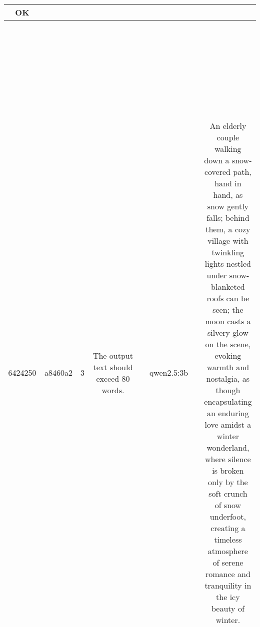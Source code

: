 \begin{table}[h!]
\begin{tabular}{|c|c|c|c|c|c|c|c|c|c|c|}
OK\\
\hline
6424250 & a8460a2 & 3 & The output text should exceed 80 words. &  & qwen2.5:3b &  & An elderly couple walking down a snow-covered path, hand in hand, as snow gently falls; behind them, a cozy village with twinkling lights nestled under snow-blanketed roofs can be seen; the moon casts a silvery glow on the scene, evoking warmth and nostalgia, as though encapsulating an enduring love amidst a winter wonderland, where silence is broken only by the soft crunch of snow underfoot, creating a timeless atmosphere of serene romance and tranquility in the icy beauty of winter. & A snow-covered path leading to a cozy village bathed in twinkling lights; an elderly couple walks hand in hand beneath a silvery moonlight that casts a glow of warmth and nostalgia across the scene paused by only the soft crunch of snow underfoot, creating a timeless atmosphere of serene romance and tranquility in the icy beauty of winter. & ok & The output is a single paragraph with a detailed focus on subjects (an elderly couple walking on a snow-covered path) and their characteristics (hand in hand). Timing and lighting are detailed with mentions of "silvery moonlight" creating a "glow of warmth and nostalgia." The background is given as a "cozy village bathed in twinkling lights." The image evokes feelings of "serene romance and tranquility." The output does not exceed 80 words. Overall, the output effectively combines artistic insight with precise imagery suitable for generating AI photos, adhering to all specified guidelines in the description.

No violation.
OK\\
\hline
672a2d5 & a8460a2 & 4 & The output text should be crafted in multiple paragraphs. &  & qwen2.5:3b &  & Fireflies floating above a tranquil lake at twilight, creating magical reflections. & Serene fireflies float gently above a tranquil lake bathed in soft golden light at dusk, casting enchanting shadows and sparkles that create whimsical reflections on the calm water’s glassy surface, evoking a sense of magic and peaceful wonder. & ok & The chatbot output complies with the description. It presents a single, coherent paragraph that describes a scene in detail, adhering to the 80-word limit. The description begins by identifying the subjects (serene fireflies) and their characteristics (float gently), and then details the timing (dusk) and lighting conditions (soft golden light). The background is illustrated with the tranquil lake and calm water’s glassy surface. The output conveys an emotion of magic and peaceful wonder, aligning with the requirement to evoke a specific feeling. The compliance is upheld as there is no violation of the chatbot description guidelines.


\end{tabular}
\end{table}
